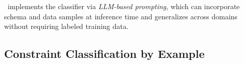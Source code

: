 

    
\system\ implements the classifier via \emph{LLM-based prompting}, which can incorporate schema and data samples at inference time and generalizes across domains without requiring labeled training data.

\subsection*{Constraint Classification by Example}


